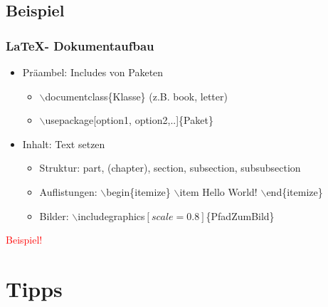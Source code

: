 \documentclass[18pt]{beamer}
\begin{document}
	\subsection{Beispiel}
	\begin{frame}
		\frametitle{\LaTeX - Dokumentaufbau}
		\begin{itemize}
			\item Präambel: Includes von Paketen
			\begin{itemize}
				\item $\backslash$documentclass\{Klasse\} (z.B. book, letter)
				\item $\backslash$usepackage[option1, option2,..]\{Paket\}
			\end{itemize}
			\pause
			\item Inhalt: Text setzen 
			\begin{itemize}
				\item Struktur: part, (chapter), section, subsection, subsubsection
				\item Auflistungen: $\backslash$begin\{itemize\} $\backslash$item Hello World! $\backslash$end\{itemize\}
				\item Bilder: $\backslash$includegraphics$[scale=0.8]$\{PfadZumBild\}
			\end{itemize}
			\pause
		\end{itemize}
		\huge \centering \textcolor{red}{Beispiel!}
	\end{frame}
		
\section{Tipps}
\end{document}

